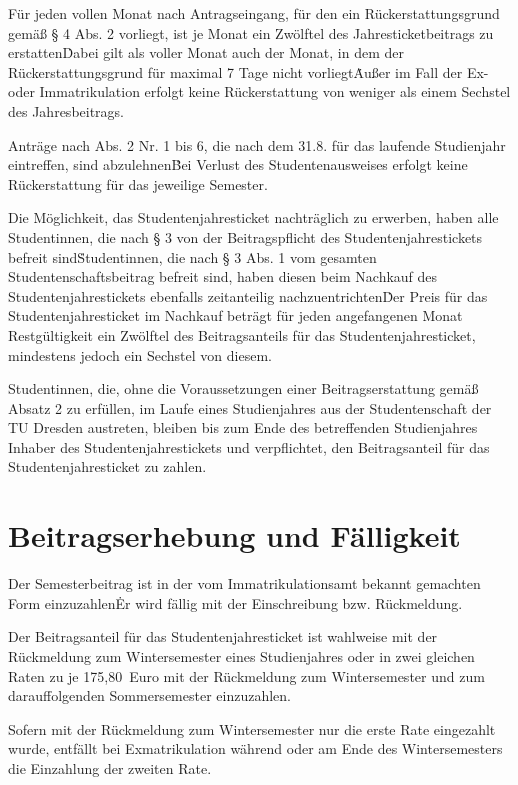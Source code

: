 \begin{multicols}{2}
\Abs \Satz  Für jeden vollen Monat nach Antragseingang, für den ein Rückerstattungsgrund gemäß § 4 Abs. 2 vorliegt, ist je Monat ein Zwölftel des Jahresticketbeitrags zu erstatten\. Dabei gilt als voller Monat auch der Monat, in dem der Rückerstattungsgrund für maximal 7 Tage nicht vorliegt\. Außer im Fall der Ex- oder Immatrikulation erfolgt keine Rückerstattung von weniger als einem Sechstel des Jahresbeitrags.

\Abs \Satz  Anträge nach Abs. 2 Nr. 1 bis 6, die nach dem 31.8. für das laufende Studienjahr eintreffen, sind abzulehnen\. Bei Verlust des Studentenausweises erfolgt keine Rückerstattung für das jeweilige Semester.

\Abs \Satz  Die Möglichkeit, das Studentenjahresticket nachträglich zu erwerben, haben alle Studentinnen, die nach § 3 von der Beitragspflicht des Studentenjahrestickets befreit sind\. Studentinnen, die nach § 3 Abs. 1 vom gesamten Studentenschaftsbeitrag befreit sind, haben diesen beim Nachkauf des Studentenjahrestickets ebenfalls zeitanteilig nachzuentrichten\. Der Preis für das Studentenjahresticket im Nachkauf beträgt für jeden angefangenen Monat Restgültigkeit ein Zwölftel des Beitragsanteils für das Studentenjahresticket, mindestens jedoch ein Sechstel von diesem.

\Abs \Satz  Studentinnen, die, ohne die Voraussetzungen einer Beitragserstattung gemäß Absatz 2 zu erfüllen, im Laufe eines Studienjahres aus der Studentenschaft der TU Dresden austreten, bleiben bis zum Ende des betreffenden Studienjahres Inhaber des Studentenjahrestickets und verpflichtet, den Beitragsanteil für das Studentenjahresticket zu zahlen.


\section{Beitragserhebung und Fälligkeit}

\Abs \Satz  Der Semesterbeitrag ist in der vom Immatrikulationsamt bekannt gemachten Form einzuzahlen\. Er wird fällig mit der Einschreibung bzw. Rückmeldung.

\Abs \Satz  Der Beitragsanteil für das Studentenjahresticket ist wahlweise mit der Rückmeldung zum Wintersemester eines Studienjahres oder in zwei gleichen Raten zu je 175,80~Euro mit der Rückmeldung zum Wintersemester und zum darauffolgenden Sommersemester einzuzahlen.

\Abs \Satz Sofern mit der Rückmeldung zum Wintersemester nur die erste Rate eingezahlt wurde, entfällt bei Exmatrikulation während oder am Ende des Wintersemesters die Einzahlung der zweiten Rate.


\end{multicols}
